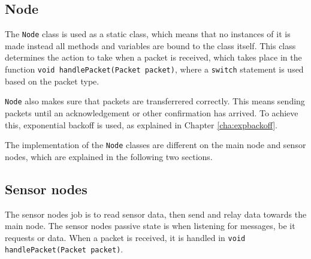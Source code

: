 \subsection{Node}
The \texttt{Node} class is used as a static class, which means that no instances of it is made instead all methods and variables are bound to the class itself. This class determines the action to take when a packet is received, which takes place in the function \texttt{void handlePacket(Packet packet)}, where a \texttt{switch} statement is used based on the packet type.

\texttt{Node} also makes sure that packets are transferrered correctly. This means sending packets until an acknowledgement or other confirmation has arrived. To achieve this, exponential backoff is used, as explained in Chapter \ref{cha:expbackoff}.

The implementation of the \texttt{Node} classes are different on the main node and sensor nodes, which are explained in the following two sections.

\subsection{Sensor nodes} 
The sensor nodes job is to read sensor data, then send and relay data towards the main node. The sensor nodes passive state is when listening for messages, be it requests or data. When a packet is received, it is handled in \texttt{void handlePacket(Packet packet)}.  

